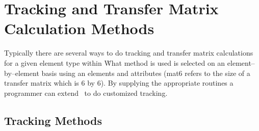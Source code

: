 \chapter{Tracking and Transfer Matrix Calculation Methods}

Typically there are several ways to do tracking and transfer matrix
calculations for a given element type within \bmad\. What method is used
is selected on an element--by--element basis using
an elements  and  attributes 
(mat6 refers to the size of a transfer matrix which is 6 by 6). By supplying
the appropriate routines a programmer can extend \bmad\ to do customized 
tracking.

\section{Tracking Methods}
\label{s:tkm}

